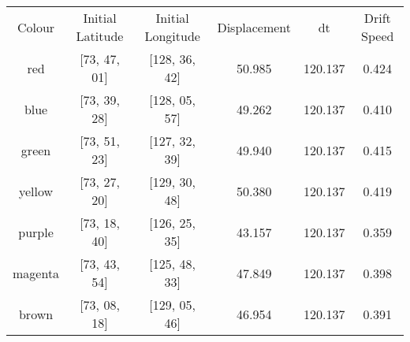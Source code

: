 \begin{tabular}{c|c c c c c}
    Colour & Initial Latitude & Initial Longitude &Displacement & dt & Drift Speed \\
    red & [73, 47, 01] & [128, 36, 42] & 50.985 & 120.137 & 0.424\\
    blue & [73, 39, 28] & [128, 05, 57] & 49.262 & 120.137 & 0.410\\
    green & [73, 51, 23] & [127, 32, 39] & 49.940 & 120.137 & 0.415\\
    yellow & [73, 27, 20] & [129, 30, 48] & 50.380 & 120.137 & 0.419\\
    purple & [73, 18, 40] & [126, 25, 35] & 43.157 & 120.137 & 0.359\\
    magenta & [73, 43, 54] & [125, 48, 33] & 47.849 & 120.137 & 0.398\\
    brown & [73, 08, 18] & [129, 05, 46] & 46.954 & 120.137 & 0.391
\end{tabular}